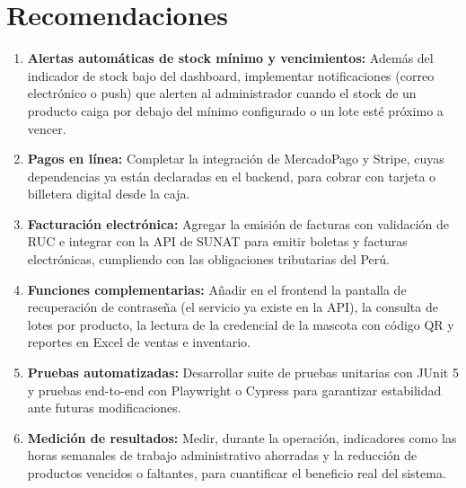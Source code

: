 \documentclass[11pt,a4paper]{report}
\begin{document}
\section{Recomendaciones}
\begin{enumerate}[label=R\arabic*.]
\item \textbf{Alertas automáticas de stock mínimo y vencimientos:} Además del indicador de stock bajo del dashboard, implementar notificaciones (correo electrónico o push) que alerten al administrador cuando el stock de un producto caiga por debajo del mínimo configurado o un lote esté próximo a vencer.
\item \textbf{Pagos en línea:} Completar la integración de MercadoPago y Stripe, cuyas dependencias ya están declaradas en el backend, para cobrar con tarjeta o billetera digital desde la caja.
\item \textbf{Facturación electrónica:} Agregar la emisión de facturas con validación de RUC e integrar con la API de SUNAT para emitir boletas y facturas electrónicas, cumpliendo con las obligaciones tributarias del Perú.
\item \textbf{Funciones complementarias:} Añadir en el frontend la pantalla de recuperación de contraseña (el servicio ya existe en la API), la consulta de lotes por producto, la lectura de la credencial de la mascota con código QR y reportes en Excel de ventas e inventario.
\item \textbf{Pruebas automatizadas:} Desarrollar suite de pruebas unitarias con JUnit 5 y pruebas end-to-end con Playwright o Cypress para garantizar estabilidad ante futuras modificaciones.
\item \textbf{Medición de resultados:} Medir, durante la operación, indicadores como las horas semanales de trabajo administrativo ahorradas y la reducción de productos vencidos o faltantes, para cuantificar el beneficio real del sistema.
\end{enumerate}
\end{document}
